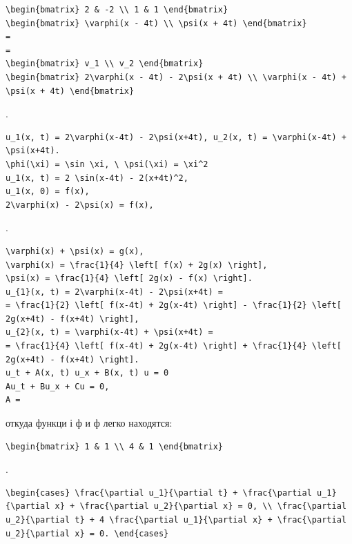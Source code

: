 \documentclass[
  ukrainian,
]{article}
\begin{document}
\begin{verbatim}
\begin{bmatrix} 2 & -2 \\ 1 & 1 \end{bmatrix}
\begin{bmatrix} \varphi(x - 4t) \\ \psi(x + 4t) \end{bmatrix}
=
=
\begin{bmatrix} v_1 \\ v_2 \end{bmatrix}
\begin{bmatrix} 2\varphi(x - 4t) - 2\psi(x + 4t) \\ \varphi(x - 4t) + \psi(x + 4t) \end{bmatrix}
\end{verbatim}

.

\begin{verbatim}
u_1(x, t) = 2\varphi(x-4t) - 2\psi(x+4t), u_2(x, t) = \varphi(x-4t) + \psi(x+4t).
\phi(\xi) = \sin \xi, \ \psi(\xi) = \xi^2
u_1(x, t) = 2 \sin(x-4t) - 2(x+4t)^2,
u_1(x, 0) = f(x),
2\varphi(x) - 2\psi(x) = f(x),
\end{verbatim}

.

\begin{verbatim}
\varphi(x) + \psi(x) = g(x),
\varphi(x) = \frac{1}{4} \left[ f(x) + 2g(x) \right],
\psi(x) = \frac{1}{4} \left[ 2g(x) - f(x) \right].
u_{1}(x, t) = 2\varphi(x-4t) - 2\psi(x+4t) =
= \frac{1}{2} \left[ f(x-4t) + 2g(x-4t) \right] - \frac{1}{2} \left[ 2g(x+4t) - f(x+4t) \right],
u_{2}(x, t) = \varphi(x-4t) + \psi(x+4t) =
= \frac{1}{4} \left[ f(x-4t) + 2g(x-4t) \right] + \frac{1}{4} \left[ 2g(x+4t) - f(x+4t) \right].
u_t + A(x, t) u_x + B(x, t) u = 0
Au_t + Bu_x + Cu = 0,
A =
\end{verbatim}

откуда функци і ф и ф легко находятся:

\begin{verbatim}
\begin{bmatrix} 1 & 1 \\ 4 & 1 \end{bmatrix}
\end{verbatim}

.

\begin{verbatim}
\begin{cases} \frac{\partial u_1}{\partial t} + \frac{\partial u_1}{\partial x} + \frac{\partial u_2}{\partial x} = 0, \\ \frac{\partial u_2}{\partial t} + 4 \frac{\partial u_1}{\partial x} + \frac{\partial u_2}{\partial x} = 0. \end{cases}
\end{verbatim}
\end{document}

